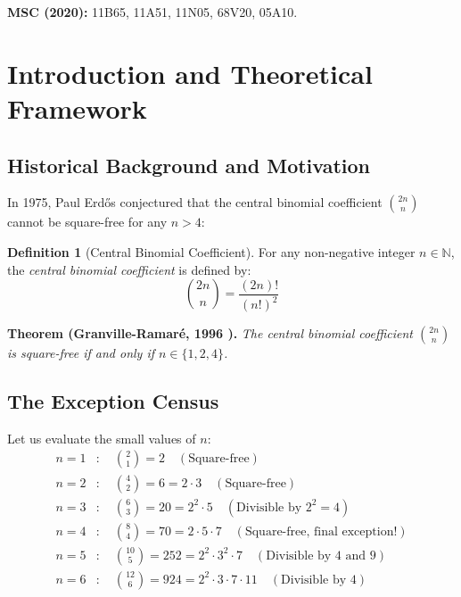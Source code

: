 \documentclass[11pt,a4paper]{article}
\theoremstyle{definition}
\newtheorem{definition}[theorem]{Definition}
\begin{document}
\noindent\textbf{MSC (2020):} 11B65, 11A51, 11N05, 68V20, 05A10.

\tableofcontents
\newpage

\section{Introduction and Theoretical Framework}

\subsection{Historical Background and Motivation}
In 1975, Paul Erd\H{o}s \cite{erdos1975binomial} conjectured that the central binomial coefficient $\binom{2n}{n}$ cannot be square-free for any $n > 4$:

\begin{definition}[Central Binomial Coefficient]\label{def:central_choose}
For any non-negative integer $n \in \mathbb{N}$, the \emph{central binomial coefficient} is defined by:
\begin{equation}\label{eq:central_choose}
\binom{2n}{n} = \frac{(2n)!}{(n!)^2}
\end{equation}
\end{definition}

\noindent\textbf{Theorem (Granville-Ramar\'e, 1996 \cite{granville1996}).} \textit{The central binomial coefficient $\binom{2n}{n}$ is square-free if and only if $n \in \{1, 2, 4\}$.}

\subsection{The Exception Census}
Let us evaluate the small values of $n$:
\begin{align*}
n = 1 &: \quad \binom{2}{1} = 2 \quad (\text{Square-free}) \\
n = 2 &: \quad \binom{4}{2} = 6 = 2 \cdot 3 \quad (\text{Square-free}) \\
n = 3 &: \quad \binom{6}{3} = 20 = 2^2 \cdot 5 \quad (\text{Divisible by } 2^2 = 4) \\
n = 4 &: \quad \binom{8}{4} = 70 = 2 \cdot 5 \cdot 7 \quad (\text{Square-free, final exception!}) \\
n = 5 &: \quad \binom{10}{5} = 252 = 2^2 \cdot 3^2 \cdot 7 \quad (\text{Divisible by } 4 \text{ and } 9) \\
n = 6 &: \quad \binom{12}{6} = 924 = 2^2 \cdot 3 \cdot 7 \cdot 11 \quad (\text{Divisible by } 4)
\end{align*}
\end{document}
